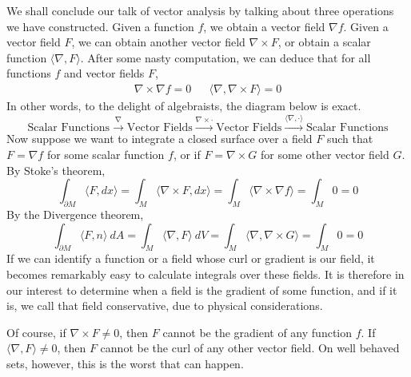 \documentclass[12pt]{amsbook}
\theoremstyle{plain}
\theoremstyle{definition}
\begin{document}
We shall conclude our talk of vector analysis by talking about three operations we have constructed. Given a function $f$, we obtain a vector field $\nabla f$. Given a vector field $F$, we can obtain another vector field $\nabla \times F$, or obtain a scalar function $\langle \nabla, F \rangle$. After some nasty computation, we can deduce that for all functions $f$ and vector fields $F$,
%
\begin{align*}
    \nabla \times \nabla f = 0 && \langle \nabla, \nabla \times F \rangle = 0
\end{align*}
%
In other words, to the delight of algebraists, the diagram below is exact.
%
\[ \text{Scalar Functions} \xrightarrow{\nabla} \text{Vector Fields} \xrightarrow{\nabla \times \cdot} \text{Vector Fields} \xrightarrow{\langle \nabla, \cdot \rangle} \text{Scalar Functions} \]
%
Now suppose we want to integrate a closed surface over a field $F$ such that $F = \nabla f$ for some scalar function $f$, or if $F = \nabla \times G$ for some other vector field $G$. By Stoke's theorem,
%
\[ \int_{\partial M} \langle F, dx \rangle = \int_M \langle \nabla \times F, dx \rangle = \int_M \langle \nabla \times \nabla f \rangle = \int_M 0 = 0 \]
%
By the Divergence theorem,
%
\[ \int_{\partial M} \langle F, n \rangle\ dA = \int_M \langle \nabla, F \rangle\ dV = \int_M \langle \nabla, \nabla \times G \rangle = \int_M 0 = 0 \]
%
If we can identify a function or a field whose curl or gradient is our field, it becomes remarkably easy to calculate integrals over these fields. It is therefore in our interest to determine when a field is the gradient of some function, and if it is, we call that field conservative, due to physical considerations.

Of course, if $\nabla \times F \neq 0$, then $F$ cannot be the gradient of any function $f$. If $\langle \nabla, F \rangle \neq 0$, then $F$ cannot be the curl of any other vector field. On well behaved sets, however, this is the worst that can happen.
\end{document}
